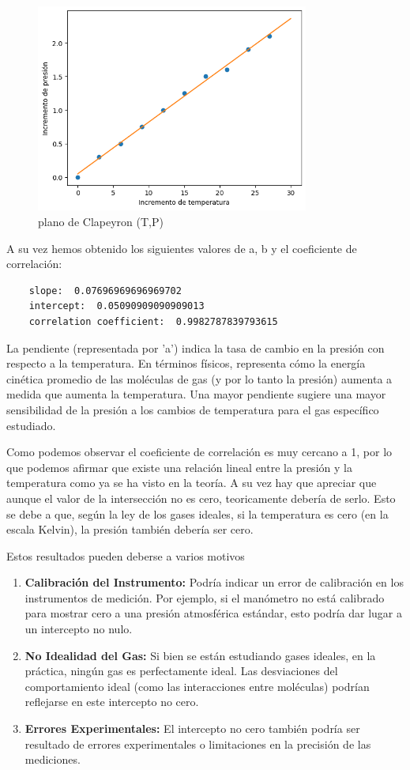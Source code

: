 \documentclass{article}
\begin{document}
\begin{figure}[h]
    \centering
    \includegraphics[width=0.8\textwidth]{chart1}
    \caption{plano de Clapeyron (T,P)}
\end{figure}

A su vez hemos obtenido los siguientes valores de a, b y el coeficiente de correlación:

\begin{verbatim}
    slope:  0.07696969696969702
    intercept:  0.05090909090909013
    correlation coefficient:  0.9982787839793615
\end{verbatim}

La pendiente (representada por 'a')
 indica la tasa de cambio en la presión con respecto a la temperatura. 
 En términos físicos, representa cómo la energía cinética promedio de las moléculas de gas 
 (y por lo tanto la presión) aumenta a medida que aumenta la temperatura. 
 Una mayor pendiente sugiere una mayor sensibilidad de la presión a los cambios 
 de temperatura para el gas específico estudiado.

Como podemos observar el coeficiente de correlación es muy cercano a 1, por lo que podemos afirmar que existe una relación lineal entre la presión y la temperatura como ya se ha visto en la teoría.
A su vez hay que apreciar que aunque el valor de la intersección no es cero, teoricamente debería de serlo. 
Esto se debe a que, según la ley de los gases ideales, si la temperatura es cero (en la escala Kelvin), la presión también debería ser cero.

Estos resultados pueden deberse a varios motivos
\begin{enumerate}
\item \textbf{Calibración del Instrumento:} Podría indicar un error de calibración en los instrumentos de medición. Por ejemplo, si el manómetro no está calibrado para mostrar cero a una presión atmosférica estándar, esto podría dar lugar a un intercepto no nulo.
\item \textbf{No Idealidad del Gas:} Si bien se están estudiando gases ideales, en la práctica, ningún gas es perfectamente ideal. Las desviaciones del comportamiento ideal (como las interacciones entre moléculas) podrían reflejarse en este intercepto no cero.
\item \textbf{Errores Experimentales:} El intercepto no cero también podría ser resultado de errores experimentales o limitaciones en la precisión de las mediciones.
\end{enumerate}
\end{document}
